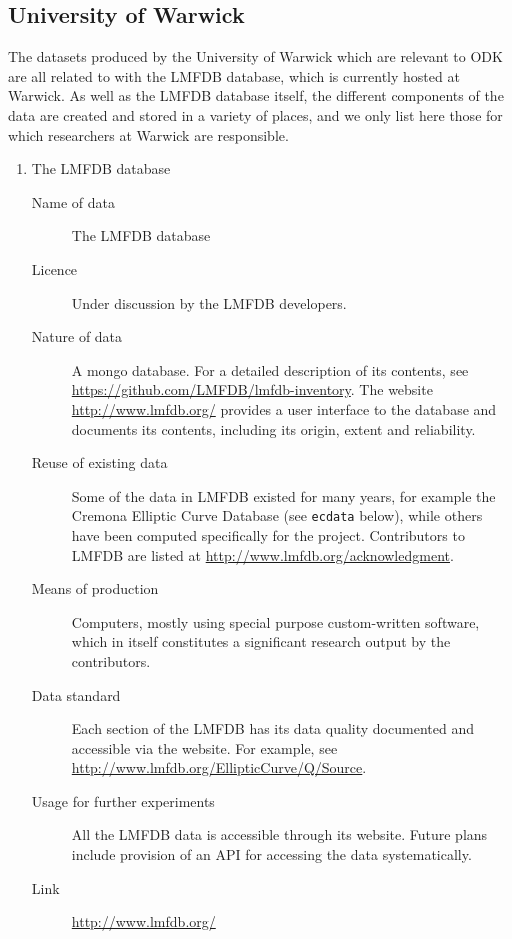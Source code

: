 \documentclass[12pt]{article}
\begin{document}
\subsection{University of Warwick}

The datasets produced by the University of Warwick which are relevant
to ODK are all related to with the LMFDB database, which is currently
hosted at Warwick.  As well as the LMFDB database itself, the
different components of the data are created and stored in a variety
of places, and we only list here those for which researchers at
Warwick are responsible.

\begin{enumerate}

\item{The LMFDB database}
\begin{description}
\item[Name of data] The LMFDB database
\item[Licence]  Under discussion by the LMFDB developers.
\item[Nature of data] A mongo database.  For a detailed description of
  its contents, see \url{https://github.com/LMFDB/lmfdb-inventory}.
  The website \url{http://www.lmfdb.org/} provides a user interface to
  the database and documents its contents, including its origin,
  extent and reliability.
\item[Reuse of existing data] Some of the data in LMFDB existed for
  many years, for example the Cremona Elliptic Curve Database (see
  {\tt ecdata} below), while others have been computed specifically
    for the project.   Contributors to LMFDB are listed at
    \url{http://www.lmfdb.org/acknowledgment}.
\item[Means of production] Computers, mostly using special purpose
  custom-written software, which in itself constitutes a significant
  research output by the contributors.
\item[Data standard] Each section of the LMFDB has its data quality
  documented and accessible via the website.  For example, see
  \url{http://www.lmfdb.org/EllipticCurve/Q/Source}.
\item [Usage for further experiments] All the LMFDB data is accessible
  through its website.  Future plans include provision of an API for
  accessing the data systematically.
\item [Link] \url{http://www.lmfdb.org/}
\end{description}


\end{enumerate}
\end{document}
